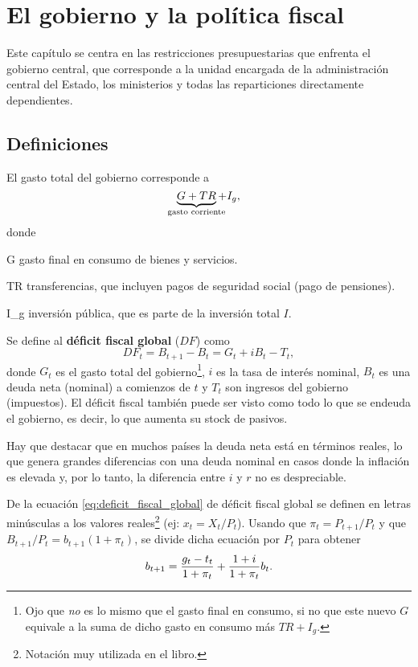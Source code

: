 \documentclass[DeGregorioResumen]{subfiles}
\begin{document}
\section{El gobierno y la política fiscal}

Este capítulo se centra en las restricciones presupuestarias que enfrenta el gobierno central, que corresponde a la unidad encargada de la administración central del Estado, los ministerios y todas las reparticiones directamente dependientes.

\subsection{Definiciones}

El gasto total del gobierno corresponde a
\begin{equation*}
\underbrace{G+TR}_{\mathclap{\text{gasto corriente}}}+I_g,
\end{equation*}
donde
\begin{where}
\item[G] gasto final en consumo de bienes y servicios.
\item[TR] transferencias, que incluyen pagos de seguridad social (pago de pensiones).
\item[I_g] inversión pública, que es parte de la inversión total $I$.
\end{where}

Se define al \textbf{déficit fiscal global} ($DF$) como
\begin{equation}
DF_t=B_{t+1}-B_t = G_t+iB_t-T_t,
\label{eq:deficit_fiscal_global}
\end{equation}
donde $G_t$ es el gasto total del gobierno\footnote{Ojo que \emph{no} es lo mismo que el gasto final en consumo, si no que este nuevo $G$ equivale a la suma de dicho gasto en consumo más $TR+I_g$.}, $i$ es la tasa de interés nominal, $B_t$ es una deuda neta (nominal) a comienzos de $t$ y $T_t$ son ingresos del gobierno (impuestos). El déficit fiscal también puede ser visto como todo lo que se endeuda el gobierno, es decir, lo que aumenta su stock de pasivos.

Hay que destacar que en muchos países la deuda neta está en términos reales, lo que genera grandes diferencias con una deuda nominal en casos donde la inflación es elevada y, por lo tanto, la diferencia entre $i$ y $r$ no es despreciable.

De la ecuación \eqref{eq:deficit_fiscal_global} de déficit fiscal global  se definen en letras minúsculas a los valores reales\footnote{Notación muy utilizada en el libro.} (ej: $x_t=X_t/P_t$). Usando que $\pi_t=P_{t+1}/P_t $ y que $B_{t+1}/P_t = b_{t+1}(1+\pi_t)$, se divide dicha ecuación por $P_t$ para obtener
\begin{equation*}
{b}_{t+1} = \frac{g_t-t_t}{1+\pi_t}+\frac{1+i}{1+\pi_t}b_t.
\end{equation*}
\end{document}
